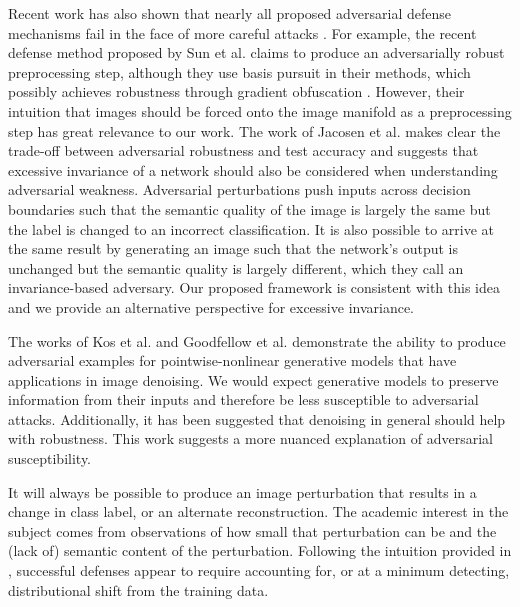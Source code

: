 Recent work has also shown that nearly all proposed adversarial defense mechanisms fail in the face of more careful attacks \parencite{carlini2017towards, athalye2018obfuscated}.
For example, the recent defense method proposed by Sun et al. \citeyearpar{sun2018adversarial} claims to produce an adversarially robust preprocessing step, although they use basis pursuit in their methods, which possibly achieves robustness through gradient obfuscation \parencite{athalye2018obfuscated}.
However, their intuition that images should be forced onto the image manifold as a preprocessing step has great relevance to our work.
The work of Jacosen et al. \citeyearpar{jacobsen2018excessive} makes clear the trade-off between adversarial robustness and test accuracy and suggests that excessive invariance of a network should also be considered when understanding adversarial weakness.
Adversarial perturbations push inputs across decision boundaries such that the semantic quality of the image is largely the same but the label is changed to an incorrect classification.
It is also possible to arrive at the same result by generating an image such that the network's output is unchanged but the semantic quality is largely different, which they call an invariance-based adversary.
Our proposed framework is consistent with this idea and we provide an alternative perspective for excessive invariance.

The works of Kos et al. \citeyearpar{kos2018adversarial} and Goodfellow et al. \citeyearpar{goodfellow2014explaining} demonstrate the ability to produce adversarial examples for pointwise-nonlinear generative models that have applications in image denoising.
We would expect generative models to preserve information from their inputs and therefore be less susceptible to adversarial attacks.
Additionally, it has been suggested that denoising in general should help with robustness.
This work suggests a more nuanced explanation of adversarial susceptibility.

It will always be possible to produce an image perturbation that results in a change in class label, or an alternate reconstruction.
The academic interest in the subject comes from observations of how small that perturbation can be and the (lack of) semantic content of the perturbation.
Following the intuition provided in \parencite{ford2019adversarial}, successful defenses appear to require accounting for, or at a minimum detecting, distributional shift from the training data.


